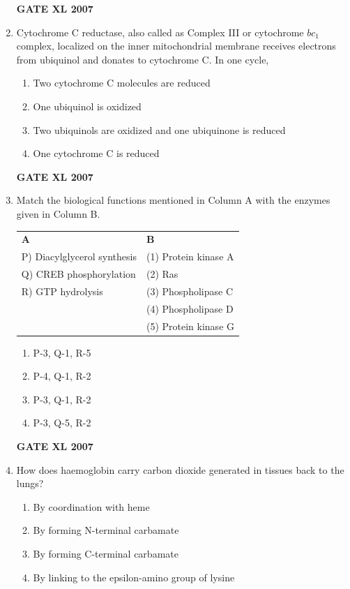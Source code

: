 \documentclass[journal,12pt,onecolumn]{IEEEtran}
\begin{document}
\begin{enumerate}
	    \hfill \textbf{GATE XL 2007}

    \item Cytochrome C reductase, also called as Complex III or cytochrome $bc_{1}$ complex, localized on the inner mitochondrial membrane receives electrons from ubiquinol and donates to cytochrome C. In one cycle, 
        \begin{enumerate} 
            \item Two cytochrome C molecules are reduced
            \item One ubiquinol is oxidized
            \item Two ubiquinols are oxidized and one ubiquinone is reduced
            \item One cytochrome C is reduced
        \end{enumerate}
    
	    \hfill \textbf{GATE XL 2007}
    \item Match the biological functions mentioned in Column A with the enzymes given in Column B. 
    \begin{tabularx}{\textwidth}{@{}lX@{}}
        \textbf{A} & \textbf{B} \\
        P) Diacylglycerol synthesis & (1) Protein kinase A \\
        Q) CREB phosphorylation & (2) Ras \\
        R) GTP hydrolysis & (3) Phospholipase C \\
        & (4) Phospholipase D \\
        & (5) Protein kinase G \\
    \end{tabularx}
        \begin{enumerate} 
            \item P-3, Q-1, R-5
            \item P-4, Q-1, R-2
            \item P-3, Q-1, R-2
            \item P-3, Q-5, R-2
        \end{enumerate}
	    \hfill \textbf{GATE XL 2007}
    
    \item How does haemoglobin carry carbon dioxide generated in tissues back to the lungs? 
        \begin{enumerate} 
            \item By coordination with heme
            \item By forming N-terminal carbamate
            \item By forming C-terminal carbamate
            \item By linking to the epsilon-amino group of lysine
        \end{enumerate}


\end{enumerate}
\end{document}
